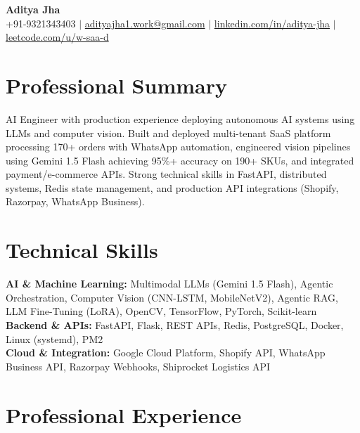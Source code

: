 \documentclass[a4paper,10pt]{article}
\begin{document}
\begin{center}
    {\Huge \textbf{Aditya Jha}} \\
    \vspace{5pt}
    \small +91-9321343403 $|$ 
    \href{mailto:adityajha1.work@gmail.com}{adityajha1.work@gmail.com} $|$ 
    \href{https://linkedin.com/in/aditya-jha}{linkedin.com/in/aditya-jha} $|$ 
    \href{https://leetcode.com/u/w-saa-d}{leetcode.com/u/w-saa-d}
\end{center}

\section*{Professional Summary}
AI Engineer with production experience deploying autonomous AI systems using LLMs and computer vision. Built and deployed multi-tenant SaaS platform processing 170+ orders with WhatsApp automation, engineered vision pipelines using Gemini 1.5 Flash achieving 95\%+ accuracy on 190+ SKUs, and integrated payment/e-commerce APIs. Strong technical skills in FastAPI, distributed systems, Redis state management, and production API integrations (Shopify, Razorpay, WhatsApp Business).

\section*{Technical Skills}
\textbf{AI \& Machine Learning:} Multimodal LLMs (Gemini 1.5 Flash), Agentic Orchestration, Computer Vision (CNN-LSTM, MobileNetV2), Agentic RAG, LLM Fine-Tuning (LoRA), OpenCV, TensorFlow, PyTorch, Scikit-learn \\
\textbf{Backend \& APIs:} FastAPI, Flask, REST APIs, Redis, PostgreSQL, Docker, Linux (systemd), PM2 \\
\textbf{Cloud \& Integration:} Google Cloud Platform, Shopify API, WhatsApp Business API, Razorpay Webhooks, Shiprocket Logistics API

\section*{Professional Experience}
\end{document}
